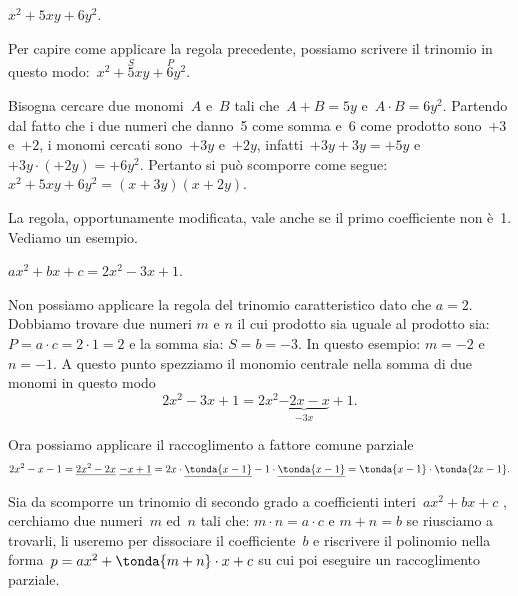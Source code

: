 \begin{esempio}
 \(x^{2}+5xy+6y^{2}\).

 Per capire come applicare la regola precedente, possiamo scrivere il
trinomio in questo modo:~\(x^{2}+\overset{S}{5}xy+\overset{P}{6}y{^{2}}\).

Bisogna cercare due monomi~\(A\) e~\(B\) tali che~\(A+B=5y\)
e~\(A\cdot B=6y^{2}\). Partendo dal fatto che i due numeri che danno~5
come somma e~6 come prodotto sono~\(+3\) e~\(+2\), i monomi cercati 
sono~\(+3y\) e~\(+2y\), infatti~\(+3y+3y=+5y\) e~\(+3y\cdot (+2y)=+6y^{2}\). 
Pertanto si può scomporre come segue:~\(x^{2}+5xy+6y^{2}=(x+3y)(x+2y)\).
 \end{esempio}

La regola, opportunamente modificata, vale anche se il primo
coefficiente non è~1. Vediamo un esempio.

 \begin{esempio}
 \(ax^2+bx+c=2x^2-3x+1\).

Non possiamo applicare la regola del trinomio caratteristico dato che 
\(a=2\).
Dobbiamo trovare due numeri \(m\) e \(n\) il cui prodotto sia uguale al 
prodotto sia: \(P = a \cdot c = 2 \cdot 1 = 2\)
e la somma sia: \(S = b = -3\).
In questo esempio: \(m = -2\) e \(n = -1\).
A questo punto spezziamo il monomio centrale nella somma di due monomi in 
questo modo
\[2x^{2}-3x+1=2x^{2}\underbrace{-2x-x}_{-3x}+1.\]

Ora possiamo applicare il raccoglimento a fattore comune parziale
\[2x^{2}-x-1=
\underline{2x^2-2x}~\underline{-x+1}=
2x \cdot \underline{\tonda{x-1}}-1 \cdot \underline{\tonda{x-1}}=
\tonda{x-1}\cdot \tonda{2x-1}.\]
 \end{esempio}

\begin{procedura}
Sia da scomporre un trinomio di secondo grado a coefficienti 
interi~\(ax^2+bx+c\)
, cerchiamo due numeri~\(m\) ed~\(n\) tali che: \quad 
\(m \cdot n = a \cdot c\) \quad 
e \quad 
\(m+n=b\)  \quad
se riusciamo a trovarli, li useremo per dissociare
il coefficiente~\(b\) e riscrivere il polinomio nella 
forma~\(p=ax^{2}+\tonda{m+n}\cdot x+c\)
su cui poi eseguire un raccoglimento parziale.
\end{procedura}

